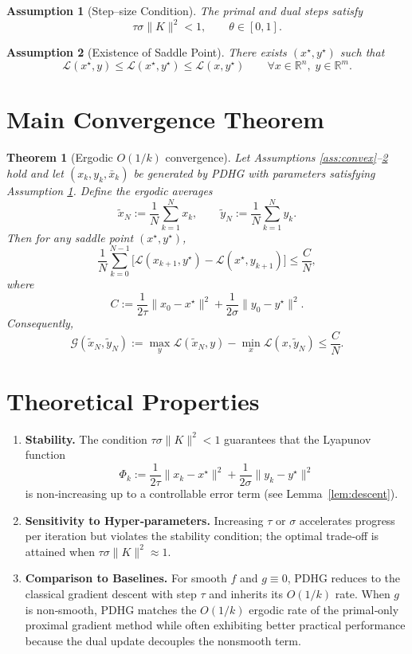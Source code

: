 \documentclass{article}
\newtheorem{theorem}{Theorem}
\newtheorem{assumption}{Assumption}
\newcommand{\RR}{\mathbb{R}}
\begin{document}
\begin{assumption}[Step–size Condition]\label{ass:step}
The primal and dual steps satisfy
\[
\tau\sigma\|K\|^{2}<1,\qquad \theta\in[0,1].
\]
\end{assumption}

\begin{assumption}[Existence of Saddle Point]\label{ass:saddle}
There exists $(x^{\star},y^{\star})$ such that
\[
\mathcal L(x^{\star},y)\le \mathcal L(x^{\star},y^{\star})\le
\mathcal L(x,y^{\star})\qquad\forall x\in\RR^{n},\;y\in\RR^{m}.
\]
\end{assumption}

\section*{Main Convergence Theorem}
\begin{theorem}[Ergodic $O(1/k)$ convergence]\label{thm:ergodic}
Let Assumptions \ref{ass:convex}–\ref{ass:saddle} hold and let
$(x_k,y_k,\bar x_k)$ be generated by PDHG with parameters satisfying
Assumption \ref{ass:step}. Define the ergodic averages
\[
\tilde x_{N}:=\frac{1}{N}\sum_{k=1}^{N}x_k,\qquad
\tilde y_{N}:=\frac{1}{N}\sum_{k=1}^{N}y_k .
\]
Then for any saddle point $(x^{\star},y^{\star})$,
\[
\frac{1}{N}\sum_{k=0}^{N-1}\bigl[\mathcal L(x_{k+1},y^{\star})-
\mathcal L(x^{\star},y_{k+1})\bigr]
\le
\frac{C}{N},
\]
where
\[
C:=\frac{1}{2\tau}\|x_{0}-x^{\star}\|^{2}
     +\frac{1}{2\sigma}\|y_{0}-y^{\star}\|^{2}.
\]
Consequently,
\[
\mathcal G(\tilde x_{N},\tilde y_{N})
:=\max_{y}\mathcal L(\tilde x_{N},y)-\min_{x}\mathcal L(x,\tilde y_{N})
\le \frac{C}{N}.
\]
\end{theorem}

\section*{Theoretical Properties}
\begin{enumerate}[label=\arabic*.]
\item \textbf{Stability.} The condition $\tau\sigma\|K\|^{2}<1$ guarantees that the
Lyapunov function
\[
\Phi_k:=\frac{1}{2\tau}\|x_k-x^{\star}\|^{2}
        +\frac{1}{2\sigma}\|y_k-y^{\star}\|^{2}
\]
is non‑increasing up to a controllable error term (see Lemma~\ref{lem:descent}).
\item \textbf{Sensitivity to Hyper‑parameters.}
   Increasing $\tau$ or $\sigma$ accelerates progress per iteration but
   violates the stability condition; the optimal trade‑off is attained
   when $\tau\sigma\|K\|^{2}\approx 1$.
\item \textbf{Comparison to Baselines.}
   For smooth $f$ and $g\equiv0$, PDHG reduces to the classical
   gradient descent with step $\tau$ and inherits its $O(1/k)$ rate.
   When $g$ is non‑smooth, PDHG matches the $O(1/k)$ ergodic rate of
   the primal‑only proximal gradient method while often exhibiting
   better practical performance because the dual update decouples the
   nonsmooth term.
\end{enumerate}
\end{document}
